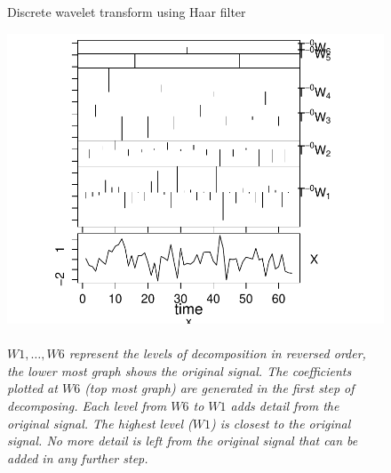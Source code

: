 \begin{figure}[H]
\caption{Discrete wavelet transform using Haar
filter}\label{figure:haar_transform}
\caption*{\\[0em]\footnotesize\emph{$W1, \ldots, W6$ represent the levels of
decomposition in reversed order, the lower most graph shows the original
signal. The coefficients plotted at $W6$ (top most graph) are generated in the
first step of decomposing. Each level from $W6$ to $W1$ adds detail from the
original signal. The highest level ($W1$) is closest to the original signal. No
more detail is left from the original signal that can be added in any further
step.}\\[1em]}
\centering
	\includegraphics[scale=0.9]{images/dwt_haar.pdf}
\end{figure}